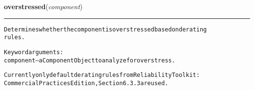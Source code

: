     \label{reliafree:calculations:overstressed}

    \vspace{0.5ex}

\hspace{.8\funcindent}\begin{boxedminipage}{\funcwidth}

    \raggedright \textbf{overstressed}(\textit{component})

    \vspace{-1.5ex}

    \rule{\textwidth}{0.5\fboxrule}
\setlength{\parskip}{2ex}
\begin{alltt}
Determines whether the component is overstressed based on derating
rules.

Keyword arguments:
component -- a Component Object to analyze for overstress.

Currently only default derating rules from Reliability Toolkit:
Commercial Practices Edition, Section 6.3.3 are used.


\end{alltt}
\end{boxedminipage}

